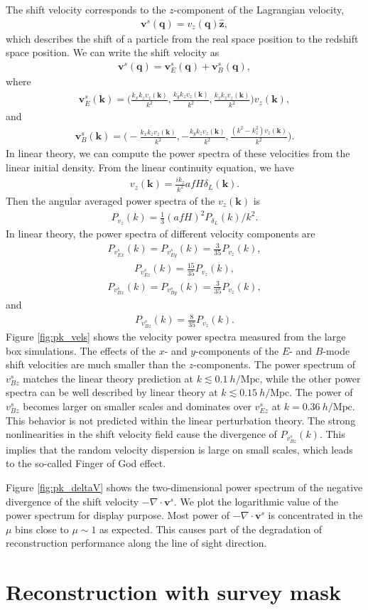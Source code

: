 \documentclass[aps,prx,twocolumn,superscriptaddress,groupedaddress,nofootinbib,amsfont]{revtex4}  %
\newcommand{\mr}{\mathrm}
\newcommand{\bea}{\begin{eqnarray}}
\newcommand{\eea}{\end{eqnarray}}
\newcommand{\bmv}{\bm{v}}
\newcommand{\bmk}{\bm{k}}
\newcommand{\bmq}{\bm{q}}
\begin{document}
The shift velocity corresponds to the $z$-component of the Lagrangian velocity,
\bea
\bmv^s(\bmq)=v_z(\bmq)\hat{\bm{z}},
\eea
which describes the shift of a particle from the real space position to the 
redshift space position. We can write the shift velocity as 
\bea
\bmv^s(\bmq)=\bmv_E^s(\bmq)+\bmv^s_B(\bmq),
\eea
where 
\bea
\bmv^s_E(\bmk)=\bigg(\frac{k_xk_zv_z(\bmk)}{k^2},\frac{k_yk_zv_z(\bmk)}{k^2},\frac{k_zk_zv_z(\bmk)}{k^2}\bigg)v_z(\bmk),
\eea
and 
\bea
\bmv^s_B(\bmk)=\bigg(-\frac{k_xk_zv_z(\bmk)}{k^2},-\frac{k_yk_zv_z(\bmk)}{k^2},\frac{(k^2-k_z^2)v_z(\bmk)}{k^2}\bigg).
\eea
In linear theory, we can compute the power spectra of these velocities from the 
linear initial density.
From the linear continuity equation, we have 
\bea
v_z(\bmk)=\frac{ik_z}{k^2}afH\delta_L(\bmk).
\eea
Then the angular averaged power spectra of the $v_z(\bmk)$ is
\bea
P_{v_z}(k)=\frac{1}{3}(afH)^2P_{\delta_L}(k)/{k^2}.
\eea
In linear theory, the power spectra of different velocity components are
\bea
P_{v^s_{Ex}}(k)=P_{v^s_{Ey}}(k)=\frac{3}{35}P_{v_z}(k),
\eea
\bea
P_{v^s_{Ez}}(k)=\frac{15}{35}P_{v_z}(k),
\eea
\bea
P_{v^s_{Bx}}(k)=P_{v^s_{By}}(k)=\frac{3}{35}P_{v_z}(k),
\eea
and
\bea
P_{v^s_{Bz}}(k)=\frac{8}{35}P_{v_z}(k).
\eea
Figure \ref{fig:pk_vels} shows the velocity power spectra measured from the 
large box simulations. The effects of the $x$- and $y$-components of the $E$-
and $B$-mode shift velocities are much smaller than the $z$-components. 
The power spectrum of ${v^s_{Bz}}$ matches the linear theory prediction at 
$k\lesssim0.1\ h/\mr{Mpc}$, while the other power spectra can be well described 
by linear theory at $k\lesssim0.15\ h/\mr{Mpc}$. The power of $v^s_{Bz}$ becomes
larger on smaller scales and dominates over $v^s_{Ez}$ at $k=0.36\ h/\mr{Mpc}$.
This behavior is not predicted within the linear perturbation theory. 
The strong nonlinearities in the shift velocity field cause the divergence of 
$P_{v^s_{Bz}}(k)$. This implies that the random velocity dispersion is large on 
small scales, which leads to the so-called Finger of God effect.

Figure \ref{fig:pk_deltaV} shows the two-dimensional power spectrum of the 
negative divergence of the shift velocity $-\nabla\cdot\bmv^s$.
We plot the logarithmic value of the power spectrum for display purpose.
Most power of $-\nabla\cdot\bmv^s$ is concentrated in the $\mu$ bins close to 
$\mu\sim1$ as expected. This causes part of the degradation of reconstruction
performance along the line of sight direction.

\section{Reconstruction with survey mask}
\label{appendix:E}
\end{document}
